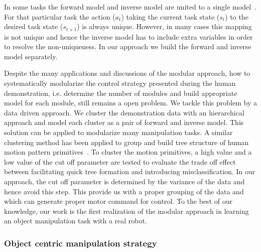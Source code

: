 In some tasks the forward model and inverse model are united to a single model~\cite{petkos2006learning}. For that particular task the action ($a_t$) taking the current task state ($s_t$) to the desired task state ($s_{t+1}$) is always unique. However, in many cases this mapping is not unique and hence the inverse model has to include extra variables in order to resolve the non-uniqueness. In our approach we build the forward and inverse model separately.

Despite the many applications and discussions of the modular approach, how to systematically modularize the control strategy presented during the human demonstration, i.e. determine the number of modules and build appropriate model for each module, still remains a open problem. We tackle this problem by a data driven approach. We cluster the demonstration data with an hierarchical approach and model each cluster as a pair of forward and inverse model. This solution can be applied to modularize many manipulation tasks. A similar clustering method has been applied to group and build tree structure of human motion pattern primitives~\cite{kulic2008incremental}. To cluster the motion primitives, a high value and a low value of the cut off parameter are tested to evaluate the trade off effect between facilitating quick tree formation and introducing misclassification. In our approach, the cut off parameter is determined by the variance of the data and hence avoid this step. This provide us with a proper grouping of the data and which can generate proper motor command for control. To the best of our knowledge, our work is the first realization of the modular approach in learning an object manipulation task with a real robot.

%
%



\subsubsection{Object centric manipulation strategy}
\label{cha4:sec2:learn:objectlevel}


